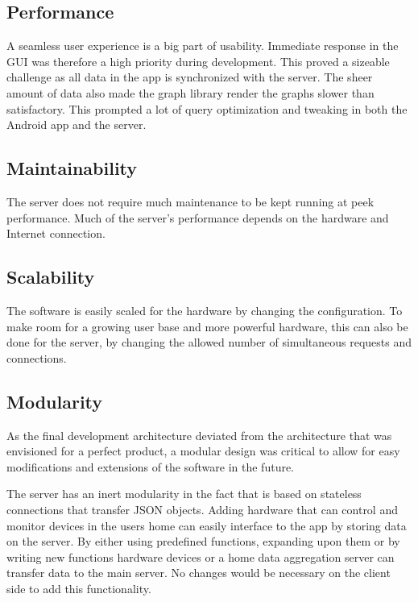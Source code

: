 \subsection{Performance}
A seamless user experience is a big part of usability. Immediate response in the GUI was therefore a high priority during development. This proved a sizeable challenge as all data in the app is synchronized with the server. 
The sheer amount of data also made the graph library render the graphs slower than satisfactory. This prompted a lot of query optimization and tweaking 
in both the Android app and the server. 

\subsection{Maintainability}
The server does not require much maintenance to be kept running at peek performance. Much of the server's performance depends on the hardware and Internet connection. 

\subsection{Scalability}
The software is easily scaled for the hardware by changing the configuration.  To make room for a growing user base and more powerful hardware, this can also be done for the server, by changing the allowed number of simultaneous requests and connections.


\subsection{Modularity}
\label{sec:modularity}
As the final development architecture deviated from the architecture that was envisioned for a perfect product, a modular design was critical to allow for easy modifications and 
extensions of the software in the future. 

The server has an inert  modularity in the fact that is based on stateless connections that transfer JSON objects. Adding hardware that can control and monitor devices in the users 
home can easily interface to the app by storing data on the server. By either using predefined functions, expanding upon them or by writing new functions hardware devices or a home data aggregation server can transfer data to the main server. No changes would be necessary on the client side to add this functionality. 
